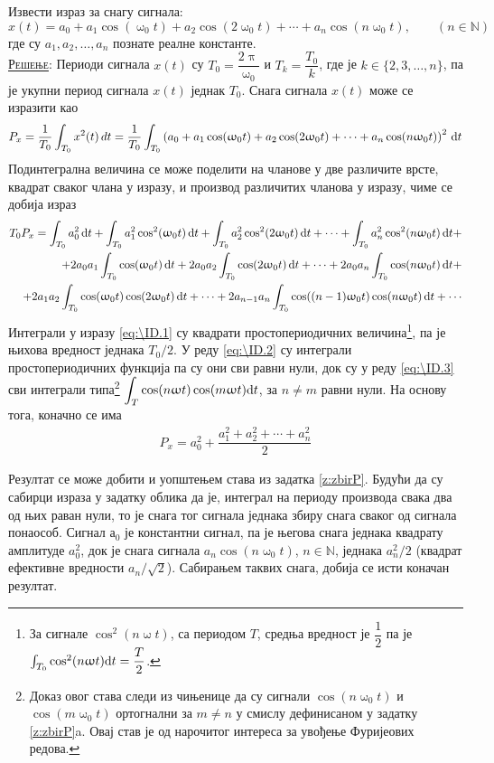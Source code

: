 \noindent 
\PID
Извести израз за снагу сигнала: 
$$
x(t) = a_0 + a_1\cos(\upomega_0 t) +
a_2 \cos(2\upomega_0 t) + \cdots 
+ a_n \cos(n\upomega_0 t), \qquad (n\in\mathbb N)
$$
где су $a_1, a_2, \ldots, a_n$ познате реалне
константе.
\\[2mm]

\textsc{\underline{Решење}}:
Периоди сигнала $x(t)$ су $T_0 = \dfrac{2\uppi}{\upomega_0}$ и $T_k = \dfrac{T_0}{k}$, где је $k \in \{2,3,\ldots,n\}$, 
па је укупни период сигнала $x(t)$ једнак $T_0$. Снага сигнала $x(t)$ може се изразити као 
\begin{equation}
P_x = \dfrac{1}{T_0}\int_{T_0} x^2(t) \, dt =  \dfrac{1}{T_0} \int_{T_0} \left( a_0 + a_1\cos(\upomega_0 t) +
a_2 \cos(2\upomega_0 t) + \cdots
+ a_n \cos(n\upomega_0 t) \right)^2 \, {\rm d} t \\
\end{equation}
Подинтегрална величина се може поделити на чланове у две различите врсте, квадрат сваког члана у изразу, и производ различитих
чланова у изразу, чиме се добија израз
\begin{eqnarray}
T_0 P_x = \int_{T_0} a_0^2 \, \de t + \int_{T_0} a_1^2\cos^2(\upomega_0 t) \, \de t   \label{eq:\ID.1}
+ \int_{T_0} a_2^2 \cos^2(2\upomega_0 t) \, \de t + \cdots + \int_{T_0} a_n^2 \cos^2(n\upomega_0 t) \, \de t + \\
+ 2a_0a_1\int_{T_0} \cos(\upomega_0 t) \, \de t + 
2a_0a_2\int_{T_0} \cos(2\upomega_0 t) \, \de t + \cdots + \label{eq:\ID.2}
2a_0a_n\int_{T_0} \cos(n\upomega_0 t) \, \de t + \\
+ 2a_1a_2\int_{T_0} \cos(\upomega_0 t)\cos(2\upomega_0 t) \, \de t + \cdots + 
2a_{n-1}a_n\int_{T_0} \cos((n-1)\upomega_0 t)\cos(n\upomega_0 t) \, \de t + \cdots   \label{eq:\ID.3}
\end{eqnarray}
Интеграли у изразу \eqref{eq:\ID.1} су квадрати простопериодичних величина\footnote{
За сигнале $\cos^2(n\upomega t)$, са периодом $T$, средња вредност је $\dfrac{1}{2}$ па је 
$\int_{T_0} \cos^2(n\upomega t) {\rm d} t = \dfrac{T}{2}$.
}, па је њихова вредност једнака $T_0/2$. У реду \eqref{eq:\ID.2} су интеграли 
простопериодичних функција па су они сви равни нули, док су у реду \eqref{eq:\ID.3} сви интеграли 
типа\footnote{
    Доказ овог става следи из чињенице да су сигнали $\cos(n \upomega_0 t)$ и $\cos(m \upomega_0 t)$
    ортогнални за $m \neq n$ у смислу дефинисаном у задатку \ref{z:zbirP}a. Овај став је од 
    нарочитог интереса за увођење Фуријеових редова.
}
$\displaystyle\int_T \cos(n\upomega t) \cos(m\upomega t) {\rm d} t$, за $n \neq m$ равни нули. На основу тога, 
коначно се има
\begin{eqnarray}
    P_x = a_0^2 + \dfrac{ a_1^2 + a_2^2 + \cdots + a_n^2 }{2}
\end{eqnarray}

Резултат се може добити и уопштењем става из задатка \ref{z:zbirP}. Будући да су сабирци израза у задатку облика 
да је, интеграл на периоду производа свака два од њих раван нули, то је снага тог сигнала једнака збиру снага сваког 
од сигнала понаособ. Сигнал $а_0$ је константни сигнал, па је његова снага једнака квадрату амплитуде 
$a_0^2$, док је снага сигнала $a_n \cos(n\upomega_0 t)$, $n \in \mathbb N$, једнака $a_n^2/2$ (квадрат ефективне вредности
$a_n/\sqrt 2$). Сабирањем таквих снага, добија се исти коначан резултат.
 